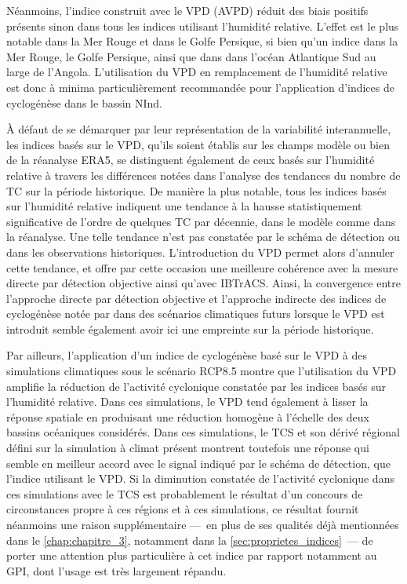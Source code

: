 \documentclass[../main.tex]{subfiles}
\begin{document}
Néanmoins, l'indice construit avec le VPD (AVPD) réduit des biais positifs présents sinon dans tous les indices utilisant l'humidité
relative. L'effet est le plus notable dans la Mer Rouge et dans le Golfe Persique, si bien qu'un indice dans la Mer Rouge, le Golfe Persique, ainsi que dans
dans l'océan Atlantique Sud au large de l'Angola. L'utilisation du VPD en remplacement de l'humidité relative est donc à minima particulièrement recommandée
pour l'application d'indices de cyclogénèse dans le bassin NInd.

À défaut de se démarquer par leur représentation de la variabilité interannuelle, les indices basés sur le VPD, qu'ils soient établis sur les champs modèle ou
bien de la réanalyse ERA5, se distinguent également de ceux basés sur l'humidité relative à travers les différences notées dans l'analyse des tendances
du nombre de TC sur la période historique. De manière la plus notable, tous les indices basés sur l'humidité relative indiquent une tendance à la
hausse statistiquement significative de l'ordre de quelques TC par décennie, dans le modèle comme dans la réanalyse. Une telle tendance n'est pas constatée par
le schéma de détection ou dans les observations historiques. L'introduction du VPD permet alors d'annuler cette tendance, et offre par cette occasion une
meilleure cohérence avec la mesure directe par détection objective ainsi qu'avec IBTrACS. Ainsi, la convergence entre l'approche directe par détection objective
et l'approche indirecte des indices de cyclogénèse notée par \textcite{camargo_testing_2014} dans des scénarios climatiques futurs lorsque le VPD est introduit
semble également avoir ici une empreinte sur la période historique.

Par ailleurs, l'application d'un indice de cyclogénèse basé sur le VPD à des simulations climatiques sous le scénario RCP8.5 montre que l'utilisation du VPD
amplifie la réduction de l'activité cyclonique constatée par les indices basés sur l'humidité relative. Dans ces simulations, le VPD tend également à lisser la
réponse spatiale en produisant une réduction homogène à l'échelle des deux bassins océaniques considérés. Dans ces simulations, le TCS et son dérivé régional
défini sur la simulation à climat présent montrent toutefois une réponse qui semble en meilleur accord avec le signal indiqué par le schéma de détection, que l'indice utilisant le VPD. Si la diminution constatée de l'activité cyclonique dans ces simulations avec le TCS est probablement le résultat d'un
concours de circonstances propre à ces régions et à ces simulations, ce résultat fournit néanmoins une raison supplémentaire ---~en plus de ses qualités déjà
mentionnées dans le \cref{chap:chapitre_3}, notamment dans la \cref{sec:proprietes_indices}~--- de porter une attention plus particulière à cet indice par
rapport notamment au GPI, dont l'usage est très largement répandu.
\end{document}
